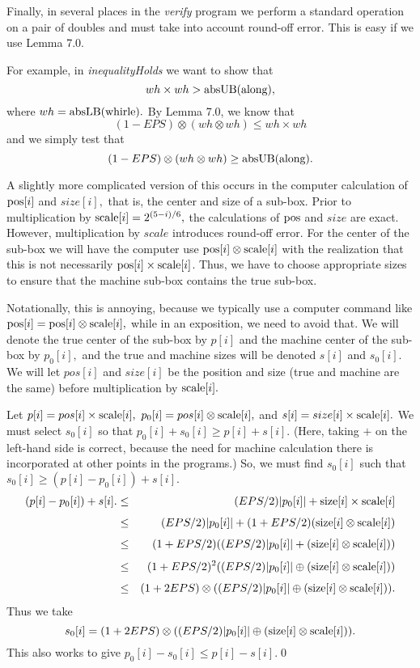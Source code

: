 Finally, in several places in the {\it verify} program we perform a standard operation on a pair of doubles and must take into account round-off error.  This is easy if we use Lemma 7.0.

For example, in {\it inequalityHolds} we want to show that $$wh \times wh  > {\rm absUB}{\rm (along),}$$ where $wh =
{\rm absLB}{\rm (whirle)}.$   
By Lemma 7.0, we know that $$(1 - EPS) \otimes (wh \otimes wh) \le wh \times wh$$ and we simply test that 
$$(1 - EPS) \otimes  (wh \otimes wh) \ge {\rm absUB}{\rm (along)}.$$

A slightly more complicated version of this occurs in the computer calculation of ${\rm pos}[i]$ and $size[i],$ that is, the center and size of a sub-box.  Prior to multiplication by ${\rm scale}[i] = 2 ^{(5 - i)/6},$  the calculations of ${\rm pos}$ and $size$ are exact.  However, multiplication by $scale$ introduces round-off error.  For the center of the sub-box we will have the computer use ${\rm pos}[i] \otimes {\rm scale}[i]$ with the realization that this is not necessarily ${\rm pos}[i] \times {\rm scale}[i]$.   Thus, we have to choose appropriate sizes to ensure that the machine sub-box contains the true sub-box.  

Notationally, this is annoying, because we typically use a computer command like ${\rm pos}[i] = {\rm pos}[i] \otimes {\rm scale}[i],$ while in an exposition, we need to avoid that.  We will denote the true center of the sub-box by $p[i]$ and the machine center of the sub-box by $p_0[i],$ and the true and machine sizes will be denoted $s[i]$ and $s_0[i].$  We will let $pos[i]$ and $size[i]$ be the position and size (true and machine are the same) before multiplication by ${\rm scale}[i].$

Let $p[i] = pos[i] \times {\rm scale}[i],\ p_0[i] = pos[i] \otimes {\rm scale}[i],$ and 
$s[i]= size[i] \times {\rm scale}[i].$  We must select $s_0[i]$ so that 
$p_0[i] + s_0[i] \ge p[i] + s[i].$  (Here, taking $+$ on the left-hand side is correct, because the need for machine calculation there is incorporated at other points in the programs.)  So, we must find $s_0[i]$ such that $s_0[i] \ge (p[i] - p_0[i]) + s[i].$
\begin{eqnarray*}
(p[i] - p_0[i]) + s[i]. &\le& (EPS/2) |p_0[i]| + {\rm size}[i] \times {\rm scale}[i]\\[4pt]
&\le& (EPS/2) |p_0[i]| + (1 + EPS/2) ({\rm size}[i] \otimes
{\rm scale}[i])\\[4pt]
&\le& (1 + EPS/2) ((EPS/2) |p_0[i]| +  ({\rm size}[i] \otimes {\rm scale}[i]))\\[4pt]
&\le& (1 + EPS/2)^2 ((EPS/2) |p_0[i]| \oplus  ({\rm size}[i]
\otimes {\rm scale}[i]))\\[4pt]
&\le& (1 + 2EPS) \otimes ((EPS/2) |p_0[i]| \oplus  ({\rm size}[i] \otimes {\rm scale}[i])).
\end{eqnarray*}
Thus we take 
$$s_0 [i]= (1 + 2EPS) \otimes ((EPS/2) |p_0[i]| \oplus  ({\rm size}[i] \otimes {\rm scale}[i])).$$
This also works to give $p_0[i] - s_0[i] \le p[i] - s[i].$\hfill\qed


 




